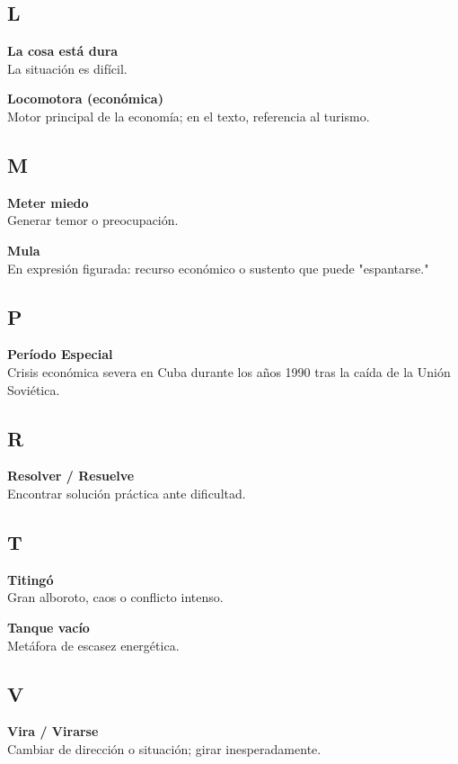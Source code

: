 \documentclass[12pt]{article}
\begin{document}
\subsection*{L}

\textbf{La cosa está dura}\\
La situación es difícil.

\textbf{Locomotora (económica)}\\
Motor principal de la economía; en el texto, referencia al turismo.

\subsection*{M}

\textbf{Meter miedo}\\
Generar temor o preocupación.

\textbf{Mula}\\
En expresión figurada: recurso económico o sustento que puede "espantarse."

\subsection*{P}

\textbf{Período Especial}\\
Crisis económica severa en Cuba durante los años 1990 tras la caída de la Unión Soviética.

\subsection*{R}

\textbf{Resolver / Resuelve}\\
Encontrar solución práctica ante dificultad.

\subsection*{T}

\textbf{Titingó}\\
Gran alboroto, caos o conflicto intenso.

\textbf{Tanque vacío}\\
Metáfora de escasez energética.

\subsection*{V}

\textbf{Vira / Virarse}\\
Cambiar de dirección o situación; girar inesperadamente.
\end{document}
